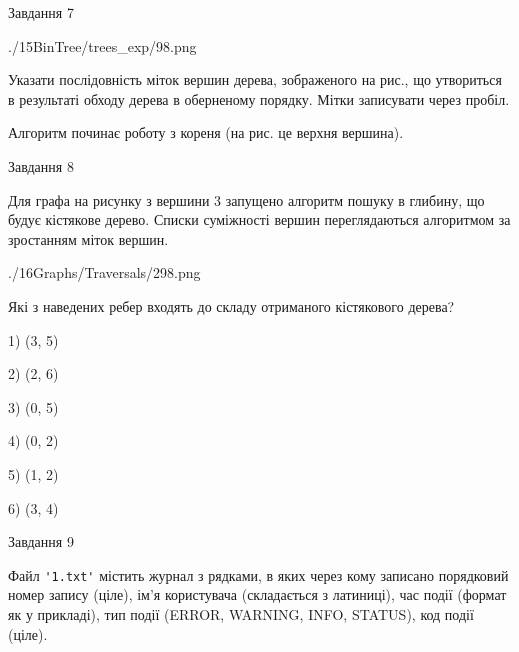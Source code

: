 \documentclass[12pt, ukrainian]{article}
\def\code#1{\Verb!#1!}
\begin{document}
{\vspace{10mm}\par

\newpage
\begin{minipage}[t]{9.7cm}
               
{\begin{center}Завдання {7}\end{center}}
\vspace{-6mm}

\begin{center}
	{./15BinTree/trees_exp/98.png}
\end{center}
Указати послідовність міток вершин дерева, зображеного на рис., що утвориться в результаті обходу дерева в оберненому порядку. Мітки записувати через пробіл.\par Алгоритм починає роботу з кореня (на рис. це верхня вершина).\par

\end{minipage}
\vline \hspace{8mm}
\begin{minipage}[t]{8.0cm}
               
{\begin{center}Завдання {8}\end{center}}
\vspace{-6mm}
Для графа на рисунку з вершини 3 запущено алгоритм пошуку в глибину, що будує кістякове дерево. Списки суміжності вершин переглядаються алгоритмом за зростанням міток вершин.\par
\begin{center}
	{./16Graphs/Traversals/298.png}
\end{center}
\par Які з наведених ребер входять до складу отриманого кістякового дерева?\par
1) (3, 5)\par
2) (2, 6)\par
3) (0, 5)\par
4) (0, 2)\par
5) (1, 2)\par
6) (3, 4)\par
{\vskip 15pt} \par

\end{minipage}

               
{\begin{center}Завдання {9}\end{center}}
\vspace{-6mm}
Файл \code{'1.txt'} містить журнал з рядками, в яких через кому записано поряд\-ко\-вий номер запису (ціле), ім'я користувача (складається з латиниці), час події (фор\-мат як у прикладі), тип події (ERROR, WARNING, INFO, STATUS), код події (ціле).

}
\end{document}
